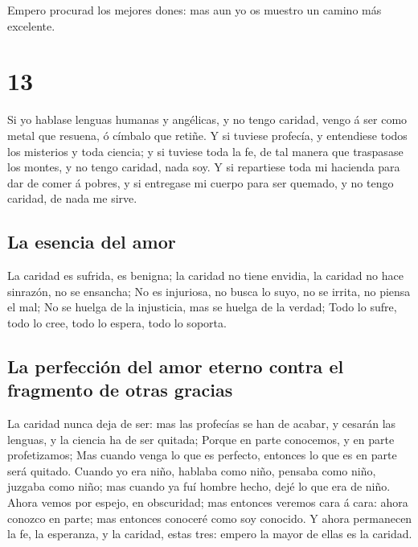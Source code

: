  Empero procurad los mejores dones: mas aun yo os muestro
un camino más excelente.

\hypertarget{section-12}{%
\section{13}\label{section-12}}

 Si yo hablase lenguas humanas y angélicas, y no tengo
caridad, vengo á ser como metal que resuena, ó címbalo que retiñe.
 Y si tuviese profecía, y entendiese todos los misterios y
toda ciencia; y si tuviese toda la fe, de tal manera que traspasase los
montes, y no tengo caridad, nada soy.  Y si repartiese toda
mi hacienda para dar de comer á pobres, y si entregase mi cuerpo para
ser quemado, y no tengo caridad, de nada me sirve.

\hypertarget{la-esencia-del-amor}{%
\subsection{La esencia del amor}\label{la-esencia-del-amor}}

 La caridad es sufrida, es benigna; la caridad no tiene
envidia, la caridad no hace sinrazón, no se ensancha;  No es
injuriosa, no busca lo suyo, no se irrita, no piensa el mal;
 No se huelga de la injusticia, mas se huelga de la verdad;
 Todo lo sufre, todo lo cree, todo lo espera, todo lo
soporta.

\hypertarget{la-perfecciuxf3n-del-amor-eterno-contra-el-fragmento-de-otras-gracias}{%
\subsection{La perfección del amor eterno contra el fragmento de otras
gracias}\label{la-perfecciuxf3n-del-amor-eterno-contra-el-fragmento-de-otras-gracias}}

 La caridad nunca deja de ser: mas las profecías se han de
acabar, y cesarán las lenguas, y la ciencia ha de ser quitada;
 Porque en parte conocemos, y en parte profetizamos;
 Mas cuando venga lo que es perfecto, entonces lo que es en
parte será quitado.  Cuando yo era niño, hablaba como niño,
pensaba como niño, juzgaba como niño; mas cuando ya fuí hombre hecho,
dejé lo que era de niño.  Ahora vemos por espejo, en
obscuridad; mas entonces veremos cara á cara: ahora conozco en parte;
mas entonces conoceré como soy conocido.  Y ahora
permanecen la fe, la esperanza, y la caridad, estas tres: empero la
mayor de ellas es la caridad.


